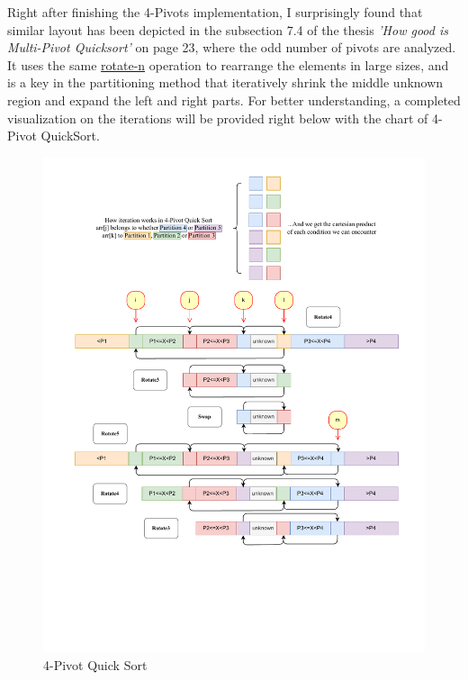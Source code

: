 \documentclass{article}
\begin{document}
Right after finishing the 4-Pivots implementation, I surprisingly found that similar layout has been depicted in the subsection 7.4
of the thesis \textit{'How good is Multi-Pivot Quicksort'} \cite{HowGoodIsMultiPivotQuicksort} on page 23, where the odd number of pivots are analyzed.
It uses the same \hyperlink{rotate-n}{rotate-n} operation to rearrange the elements in large sizes, and is a key in the partitioning method that
iteratively shrink the middle unknown region and expand the left and right parts. 
For better understanding, a completed visualization on the iterations will be provided right below with the chart of 4-Pivot QuickSort.

\begin{figure}[H]
    \hypertarget{fig:4pivot}{}
    \caption{4-Pivot Quick Sort}
    \centering
    \hspace*{-0.25\textwidth}
    \includegraphics[width=1.5\textwidth]{4pivot.drawio.pdf}
\end{figure}
\end{document}

